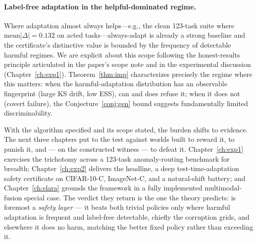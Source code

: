 \paragraph{Label-free adaptation in the helpful-dominated regime.}
Where adaptation almost always helps---e.g., the clean 123-task suite where
$\text{mean}|\Delta| = 0.132$ on acted tasks---always-adapt is already a strong
baseline and the certificate's distinctive value is bounded by the frequency of
detectable harmful regimes.  We are explicit about this scope following the
honest-results principle articulated in the paper's scope note and in the
experimental discussion (Chapter~\ref{ch:exp1}).
Theorem~\ref{thm:imp} characterizes precisely the regime where this matters:
when the harmful-adaptation distribution has an observable fingerprint (large KS
drift, low ESS), \KGA{} can and does refuse it; when it does not
(covert failure), the Conjecture~\ref{conj:gen} bound suggests fundamentally
limited discriminability.

With the algorithm specified and its scope stated, the burden shifts to evidence.  The
next three chapters put \KGA{} to the test against worlds built to reward it, to punish
it, and --- on the constructed witness --- to defeat it.  Chapter~\ref{ch:exp1} exercises
the trichotomy across a 123-task anomaly-routing benchmark for breadth; Chapter~\ref{ch:exp2}
delivers the headline, a deep test-time-adaptation safety certificate on CIFAR-10-C,
ImageNet-C, and a natural-shift battery; and Chapter~\ref{ch:elara} grounds the framework
in a fully implemented multimodal-fusion special case.  The verdict they return is the one
the theory predicts: \KGA{} is foremost a \emph{safety layer} --- it beats both trivial
policies only where harmful adaptation is frequent and label-free detectable, chiefly the
corruption grids, and elsewhere it does no harm, matching the better fixed policy rather
than exceeding it.